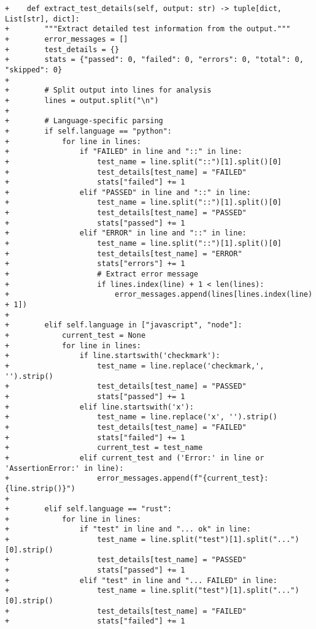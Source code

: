 \begin{lstlisting}[style=diffstyle]
+    def extract_test_details(self, output: str) -> tuple[dict, List[str], dict]:
+        """Extract detailed test information from the output."""
+        error_messages = []
+        test_details = {}
+        stats = {"passed": 0, "failed": 0, "errors": 0, "total": 0, "skipped": 0}
+
+        # Split output into lines for analysis
+        lines = output.split("\n")
+        
+        # Language-specific parsing
+        if self.language == "python":
+            for line in lines:
+                if "FAILED" in line and "::" in line:
+                    test_name = line.split("::")[1].split()[0]
+                    test_details[test_name] = "FAILED"
+                    stats["failed"] += 1
+                elif "PASSED" in line and "::" in line:
+                    test_name = line.split("::")[1].split()[0]
+                    test_details[test_name] = "PASSED"
+                    stats["passed"] += 1
+                elif "ERROR" in line and "::" in line:
+                    test_name = line.split("::")[1].split()[0]
+                    test_details[test_name] = "ERROR"
+                    stats["errors"] += 1
+                    # Extract error message
+                    if lines.index(line) + 1 < len(lines):
+                        error_messages.append(lines[lines.index(line) + 1])
+        
+        elif self.language in ["javascript", "node"]:
+            current_test = None
+            for line in lines:
+                if line.startswith('checkmark'):
+                    test_name = line.replace('checkmark,', '').strip()
+                    test_details[test_name] = "PASSED"
+                    stats["passed"] += 1
+                elif line.startswith('x'):
+                    test_name = line.replace('x', '').strip()
+                    test_details[test_name] = "FAILED"
+                    stats["failed"] += 1
+                    current_test = test_name
+                elif current_test and ('Error:' in line or 'AssertionError:' in line):
+                    error_messages.append(f"{current_test}: {line.strip()}")
+
+        elif self.language == "rust":
+            for line in lines:
+                if "test" in line and "... ok" in line:
+                    test_name = line.split("test")[1].split("...")[0].strip()
+                    test_details[test_name] = "PASSED"
+                    stats["passed"] += 1
+                elif "test" in line and "... FAILED" in line:
+                    test_name = line.split("test")[1].split("...")[0].strip()
+                    test_details[test_name] = "FAILED"
+                    stats["failed"] += 1

\end{lstlisting}

